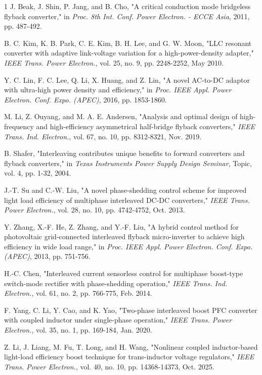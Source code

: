 \documentclass[lettersize,journal]{IEEEtran}
\begin{document}
\begin{thebibliography}{1}
J. Beak, J. Shin, P. Jang, and B. Cho, "A critical conduction mode bridgeless flyback converter," in \textit{Proc. 8th Int. Conf. Power Electron. - ECCE Asia}, 2011, pp. 487-492.

B. C. Kim, K. B. Park, C. E. Kim, B. H. Lee, and G. W. Moon, "LLC resonant converter with adaptive link-voltage variation for a high-power-density adapter," \textit{IEEE Trans. Power Electron.}, vol. 25, no. 9, pp. 2248-2252, May 2010.

Y. C. Lin, F. C. Lee, Q. Li, X. Huang, and Z. Lin, "A novel AC-to-DC adaptor with ultra-high power density and efficiency," in \textit{Proc. IEEE Appl. Power Electron. Conf. Expo. (APEC)}, 2016, pp. 1853-1860.

M. Li, Z. Ouyang, and M. A. E. Andersen, "Analysis and optimal design of high-frequency and high-efficiency asymmetrical half-bridge flyback converters," \textit{IEEE Trans. Ind. Electron.}, vol. 67, no. 10, pp. 8312-8321, Nov. 2019.

B. Shafer, "Interleaving contributes unique benefits to forward converters and flyback converters," in \textit{Texas Instruments Power Supply Design Seminar}, Topic, vol. 4, pp. 1-32, 2004.

J.-T. Su and C.-W. Liu, "A novel phase-shedding control scheme for improved light load efficiency of multiphase interleaved DC-DC converters," \textit{IEEE Trans. Power Electron.}, vol. 28, no. 10, pp. 4742-4752, Oct. 2013.

Y. Zhang, X.-F. He, Z. Zhang, and Y.-F. Liu, "A hybrid control method for photovoltaic grid-connected interleaved flyback micro-inverter to achieve high efficiency in wide load range," in \textit{Proc. IEEE Appl. Power Electron. Conf. Expo. (APEC)}, 2013, pp. 751-756.

H.-C. Chen, "Interleaved current sensorless control for multiphase boost-type switch-mode rectifier with phase-shedding operation," \textit{IEEE Trans. Ind. Electron.}, vol. 61, no. 2, pp. 766-775, Feb. 2014.

F. Yang, C. Li, Y. Cao, and K. Yao, "Two-phase interleaved boost PFC converter with coupled inductor under single-phase operation," \textit{IEEE Trans. Power Electron.}, vol. 35, no. 1, pp. 169-184, Jan. 2020.

Z. Li, J. Liang, M. Fu, T. Long, and H. Wang, "Nonlinear coupled inductor-based light-load efficiency boost technique for trans-inductor voltage regulators," \textit{IEEE Trans. Power Electron.}, vol. 40, no. 10, pp. 14368-14373, Oct. 2025.


\end{thebibliography}
\end{document}
